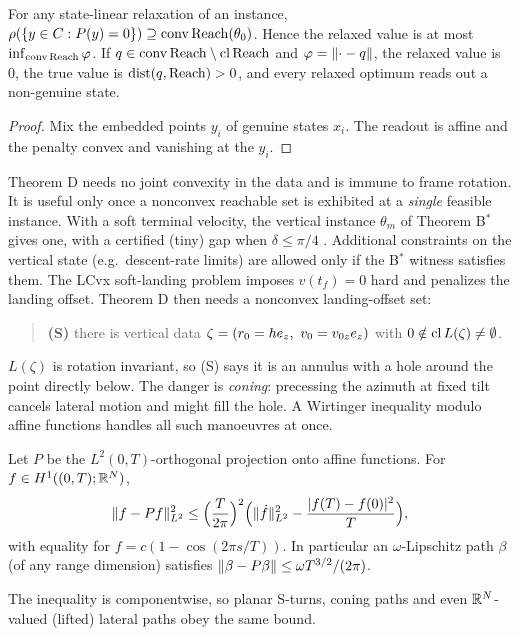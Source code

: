 \begin{theorem}[Theorem D]\label{thm:D}
For any state-linear relaxation of an instance, $\rho(\{y\in C:P(y)=0\})\supseteq\operatorname{conv}\mathrm{Reach}(\theta_0)$. Hence the relaxed value
is at most $\inf_{\operatorname{conv}\mathrm{Reach}}\varphi$. If $q\in\operatorname{conv}\mathrm{Reach}\setminus\operatorname{cl}\mathrm{Reach}$ and $\varphi=\lVert \cdot-q\rVert$, the relaxed value is
$0$, the true value is $\operatorname{dist}(q,\mathrm{Reach})>0$, and every relaxed optimum reads out a non-genuine state.\Slean
\end{theorem}
\begin{proof}
Mix the embedded points $y_i$ of genuine states $x_i$. The readout is affine and the penalty convex and vanishing at
the $y_i$.
\end{proof}
Theorem D needs no joint convexity in the data and is immune to frame rotation. It is useful only once a nonconvex
reachable set is exhibited at a \emph{single} feasible instance. With a soft terminal velocity, the vertical instance
$\theta_m$ of Theorem B$^*$ gives one, with a certified (tiny) gap when $\delta\le\pi/4$ . Additional
constraints on the vertical state (e.g.\ descent-rate limits) are allowed only if the B$^*$ witness satisfies them. The LCvx soft-landing
problem imposes $v(t_f)=0$ hard and penalizes the landing offset. Theorem D then needs a nonconvex landing-offset set:
\begin{quote}
\textbf{(S)} there is vertical data $\zeta=(r_0=he_z,\ v_0=v_{0z}e_z)$ with $0\notin\operatorname{cl} L(\zeta)\neq\emptyset$.
\end{quote}
$L(\zeta)$ is rotation invariant, so (S) says it is an annulus with a hole around the point directly below. The danger
is \emph{coning}: precessing the azimuth at fixed tilt cancels lateral motion and might fill the hole. A Wirtinger
inequality modulo affine functions handles all such manoeuvres at once.

\begin{lemma}\label{lem:W}
Let $P$ be the $L^2(0,T)$-orthogonal projection onto affine functions. For $f\in H^1((0,T);\mathbb{R}^N)$,
\[
\lVert f-Pf\rVert_{L^2}^2\le\Big(\frac T{2\pi}\Big)^2\Big(\lVert \dot f\rVert_{L^2}^2-\frac{|f(T)-f(0)|^2}{T}\Big),
\]
with equality for $f=c(1-\cos(2\pi s/T))$. In particular an $\omega$-Lipschitz path $\beta$ (of any range dimension)
satisfies $\lVert \beta-P\beta\rVert\le\omega T^{3/2}/(2\pi)$.\Sproved\ \Slean
\end{lemma}
The inequality is componentwise, so planar S-turns, coning paths and even $\mathbb{R}^N$-valued (lifted) lateral paths obey
the same bound.

